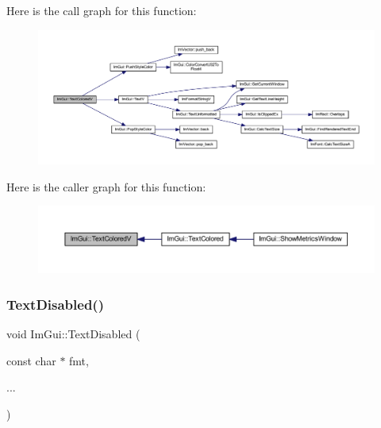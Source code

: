 Here is the call graph for this function\+:
\nopagebreak
\begin{figure}[H]
\begin{center}
\leavevmode
\includegraphics[width=350pt]{namespace_im_gui_a87c24ece994188a7145d8feecb4439ed_cgraph}
\end{center}
\end{figure}
Here is the caller graph for this function\+:
\nopagebreak
\begin{figure}[H]
\begin{center}
\leavevmode
\includegraphics[width=350pt]{namespace_im_gui_a87c24ece994188a7145d8feecb4439ed_icgraph}
\end{center}
\end{figure}
\mbox{\label{namespace_im_gui_aa96bf14c5fa288e106820aeb4ba7fcb6}} 
\subsubsection{\texorpdfstring{Text\+Disabled()}{TextDisabled()}}
{\footnotesize\ttfamily void Im\+Gui\+::\+Text\+Disabled (\begin{DoxyParamCaption}\item[{const char $\ast$}]{fmt,  }\item[{}]{... }\end{DoxyParamCaption})}

